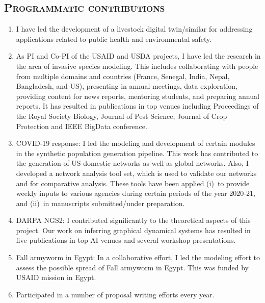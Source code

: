 \documentclass[margin,10pt]{res} %
\begin{document}
\begin{resume}
{\section{\textnormal{\textsc{Programmatic contributions}}}
\begin{enumerate}[$\circ$]
\item I have led the development of a livestock digital twin/similar for
addressing applications related to public health and environmental safety. 
\item As PI and Co-PI of the USAID and USDA projects, I have led the
research in the area of invasive species modeling. This includes
collaborating with people from multiple domains and countries (France,
Senegal, India, Nepal, Bangladesh, and US), presenting in annual meetings,
data exploration, providing content for news reports, mentoring students,
and preparing annual reports. It has resulted in publications in top venues
including Proceedings of the Royal Society Biology, Journal of Pest
Science, Journal of Crop Protection and IEEE BigData conference.
\item COVID-19 response: I led the modeling and development of certain
modules in the synthetic population generation pipeline. This work has
contributed to the generation of US domestic networks as well as global
networks. Also, I developed a network analysis tool set, which is used to
validate our networks and for comparative analysis. These tools have been
applied (i)~to provide weekly inputs to various agencies during certain
periods of the year 2020-21, and (ii)~in manuscripts submitted/under
preparation.
\item DARPA NGS2: I contributed significantly to the theoretical aspects of
this project. Our work on inferring graphical dynamical systems has
resulted in five publications in top AI venues and several workshop
presentations.
\item Fall armyworm in Egypt: In a collaborative effort, I led the modeling
effort to assess the possible spread of Fall armyworm in Egypt. This was
funded by USAID mission in Egypt.
\item Participated in a number of proposal writing efforts every year.
\end{enumerate}

}
\end{resume}
\end{document}

